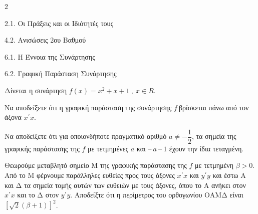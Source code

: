 \begin{ylh}{2}
    \item 2.1. Οι Πράξεις και οι Ιδιότητές τους
    \item 4.2. Ανισώσεις 2ου Βαθμού
    \item 6.1. Η Έννοια της Συνάρτησης
    \item 6.2. Γραφική Παράσταση Συνάρτησης
\end{ylh}
Δίνεται η συνάρτηση $f(x) = x^{2} + x + 1\ ,\ x \in R$.

\begin{alist}
\item Να αποδείξετε ότι η γραφική παράσταση της συνάρτησης $f\ $βρίσκεται πάνω από τον άξονα $x΄x$.
\item Να αποδείξετε ότι για οποιονδήποτε πραγματικό αριθμό $a \neq - \dfrac{1}{2}$, τα σημεία της γραφικής παράστασης της $f$ με τετμημένες $a$ και $–\ a\ –\ 1$ έχουν την ίδια τεταγμένη.
\item Θεωρούμε μεταβλητό σημείο Μ της γραφικής παράστασης της $f$ με τετμημένη $\beta > 0$. Από το Μ φέρνουμε παράλληλες ευθείες προς τους άξονες $x΄x$ και $y΄y$ και έστω Α και Δ τα σημεία τομής αυτών των ευθειών με τους άξονες, όπου το Α ανήκει στον $x΄x$ και το Δ στον $y΄y$. Αποδείξτε ότι η περίμετρος του ορθογωνίου ΟΑΜΔ είναι $\left\lbrack \sqrt{2}(\beta + 1) \right\rbrack^{2}$.

\end{alist}

